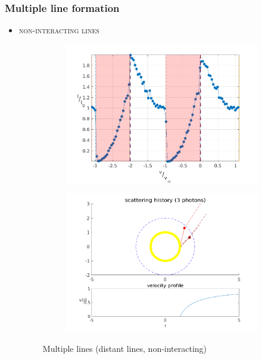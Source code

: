 \documentclass[../main/main.tex]{subfiles}
\begin{document}
\newpage
\subsubsection{Multiple line formation}
\begin{itemize}
\item \textsc{non-interacting lines}
	\begin{figure}[H]
	\centering	
	\hspace*{-0.5in}
	\begin{subfigure}{.6\textwidth}
	\includegraphics[width=1\textwidth]{../../two_resonance_lines/figures/multiple_lines_distant.png}
	\end{subfigure}%
	\begin{subfigure}{.6\textwidth}
	\includegraphics[width=1\textwidth]{../../two_resonance_lines/figures/multiple_lines_photon_path_distant.png}
	\end{subfigure}
	\caption{Multiple lines (distant lines, non-interacting)}
	\label{multiple_lines_1}
	\end{figure}
	

\end{itemize}
\end{document}
